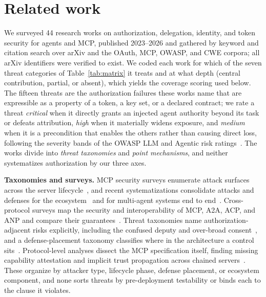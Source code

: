 \section{Related work}\label{sec:related}
We surveyed 44 research works on authorization, delegation, identity, and token
security for agents and MCP, published 2023--2026 and gathered by keyword and
citation search over arXiv and the OAuth, MCP, OWASP, and CWE corpora; all arXiv
identifiers were verified to exist. We coded each work for which of the seven threat
categories of Table~\ref{tab:matrix} it treats and at what depth (central
contribution, partial, or absent), which yields the coverage scoring used below. The
fifteen threats are the authorization failures these works name that are expressible
as a property of a token, a key set, or a declared contract; we rate a threat
\emph{critical} when it directly grants an injected agent authority beyond its task or
defeats attribution, \emph{high} when it materially widens exposure, and \emph{medium}
when it is a precondition that enables the others rather than causing direct loss,
following the severity bands of the OWASP LLM and Agentic risk
ratings~\cite{owaspllm,owaspagentic}. The works divide into \emph{threat taxonomies}
and \emph{point mechanisms}, and neither systematizes authorization by our three axes.

\noindent\textbf{Taxonomies and surveys.} MCP security surveys enumerate attack
surfaces across the server lifecycle~\cite{agentauth2025mcplandscape}, and recent
systematizations consolidate attacks and defenses for the
ecosystem~\cite{agentauth2025sokmcp} and for multi-agent systems end to
end~\cite{agentauth2026sokmultiagent}. Cross-protocol surveys map the security and
interoperability of MCP, A2A, ACP, and ANP and compare their
guarantees~\cite{agentauth2025commsurvey,agentauth2025interopsurvey,agentauth2025protocolcompare}.
Threat taxonomies name authorization-adjacent
risks explicitly, including the confused deputy and over-broad
consent~\cite{agentauth2026mcp38}, and a defense-placement taxonomy classifies where
in the architecture a control sits~\cite{agentauth2026mcpdpt}. Protocol-level
analyses dissect the MCP specification itself, finding missing capability attestation
and implicit trust propagation across chained
servers~\cite{agentauth2026breakingprotocol,agentauth2026mcpdesign}. These organize by
attacker type, lifecycle phase, defense placement, or ecosystem component, and none
sorts threats by pre-deployment testability or binds each to the clause it violates.

